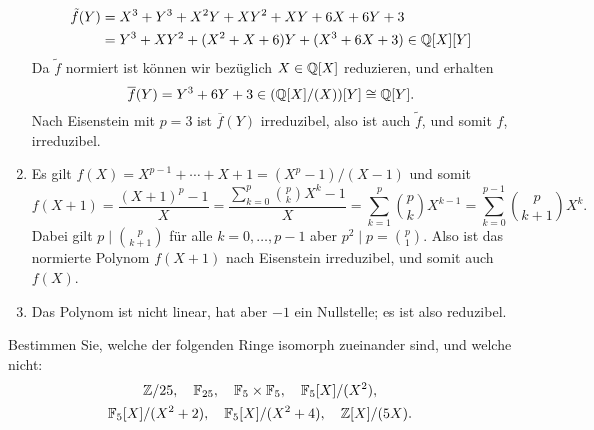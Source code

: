 \begin{solution}
\begin{enumerate}
\begin{align*}
            \tilde{f}(Y)
        &=  X^3 + Y^3 + X^2 Y + X Y^2 + X Y + 6 X + 6 Y + 3
        \\
        &=  Y^3 + X Y^2 + (X^2 + X + 6) Y + (X^3 + 6X + 3)
        \in \mathbb{Q}[X][Y]
      \end{align*}
      Da $\tilde{f}$ normiert ist können wir bezüglich $X \in \mathbb{Q}[X]$ reduzieren, und erhalten
      \[
              \overline{f}(Y)
        =     Y^3 + 6 Y + 3
        \in   (\mathbb{Q}[X]/(X))[Y]
        \cong \mathbb{Q}[Y].
      \]
      Nach Eisenstein mit $p = 3$ ist $\overline{f}(Y)$ irreduzibel, also ist auch $\tilde{f}$, und somit $f$, irreduzibel.
    \item
      Es gilt $f(X) = X^{p-1} + \dotsb + X + 1 = (X^p - 1)/(X - 1)$ und somit
      \[
          f(X+1)
        = \frac{(X+1)^p-1}{X}
        = \frac{\sum_{k=0}^p \binom{p}{k} X^k - 1}{X}
        = \sum_{k=1}^p \binom{p}{k} X^{k-1}
        = \sum_{k=0}^{p-1} \binom{p}{k+1} X^k.
      \]
      Dabei gilt $p \mid \binom{p}{k+1}$ für alle $k = 0, \dotsc, p-1$ aber $p^2 \mid p = \binom{p}{1}$.
      Also ist das normierte Polynom $f(X+1)$ nach Eisenstein irreduzibel, und somit auch $f(X)$.
    \item
      Das Polynom ist nicht linear, hat aber $-1$ ein Nullstelle; es ist also reduzibel.
  \end{enumerate}
\end{solution}


 \begin{question}
  Bestimmen Sie, welche der folgenden Ringe isomorph zueinander sind, und welche nicht:
  \begin{gather*}
    \mathbb{Z}/25,
    \quad
    \mathbb{F}_{25},
    \quad
    \mathbb{F}_5 \times \mathbb{F}_5,
    \quad
    \mathbb{F}_5[X]/(X^2),
    \\
    \mathbb{F}_5[X]/(X^2+2),
    \quad
    \mathbb{F}_5[X]/(X^2+4),
    \quad
    \mathbb{Z}[X]/(5X).
  \end{gather*}
\end{question}


